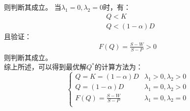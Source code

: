 \documentclass[12pt,a4paper]{article}
\begin{document}
则判断其成立。   
当$\lambda_1 =0,\lambda_2 =0$时，有：
\begin{align*}
    &Q < K \\
    &Q < \left( 1-\alpha \right) D 
\end{align*}
且验证：
\begin{align*}
    F\left( Q \right) =\frac{S-W}{S-P} >0
\end{align*}
则判断其成立。\\
综上所述，可以得到最优解$Q^*$的计算方法为：
\begin{equation}
    \left\{ \begin{matrix}
        Q =K=\left( 1-\alpha \right) D &	\lambda_1 >0,\lambda_2>0	\\
        Q =\left( 1-\alpha \right) D &	\lambda_1 =0,\lambda_2>0	\\
        F\left( Q \right) =\frac{S-W}{S-P}  &	\lambda_1 =0,\lambda_2 =0	\\
    \end{matrix} \right.
\end{equation}

     

\vspace{10pt}
\noindent
\end{document}
